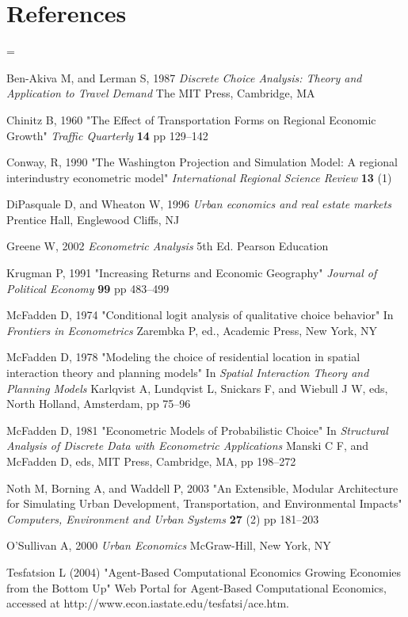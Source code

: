 \section*{References}

\newlength{\lengthstorage}
\lengthstorage=\parindent
\parindent=0pt
\parskip=2mm

Ben-Akiva M, and Lerman S, 1987 \textit{Discrete Choice Analysis:
Theory and Application to Travel Demand}  The MIT Press,
Cambridge, MA

Chinitz B, 1960 "The Effect of Transportation Forms on Regional
Economic Growth" \textit{Traffic Quarterly} \textbf{14} pp
129--142

Conway, R, 1990 "The Washington Projection and Simulation Model: A
regional interindustry econometric model" \textit{International
Regional Science Review} \textbf{13} (1)

DiPasquale D, and Wheaton W, 1996 \textit{Urban economics and real
estate markets} Prentice Hall, Englewood Cliffs, NJ

Greene W, 2002 \textit{Econometric Analysis} 5th Ed. Pearson
Education

Krugman P, 1991 "Increasing Returns and Economic Geography"
\textit{Journal of Political Economy} \textbf{99} pp 483--499


McFadden D, 1974 "Conditional logit analysis of qualitative choice
behavior" In \textit{Frontiers in Econometrics} Zarembka P, ed.,
Academic Press, New York, NY

McFadden D, 1978 "Modeling the choice of residential location in
spatial interaction theory and planning models" In \textit{Spatial
Interaction Theory and Planning Models} Karlqvist A, Lundqvist L,
Snickars F, and Wiebull J W, eds, North Holland, Amsterdam, pp
75--96

McFadden D, 1981 "Econometric Models of Probabilistic Choice" In
\textit{Structural Analysis of Discrete Data with Econometric
Applications} Manski C F, and McFadden D, eds, MIT Press,
Cambridge, MA, pp 198--272


Noth M, Borning A, and Waddell P, 2003 "An Extensible, Modular
Architecture for Simulating Urban Development, Transportation, and
Environmental Impacts" \textit{Computers, Environment and Urban
Systems} \textbf{27} (2) pp 181--203

O'Sullivan A, 2000 \textit{Urban Economics} McGraw-Hill, New York,
NY

Tesfatsion L (2004)  "Agent-Based Computational Economics Growing
Economies from the Bottom Up" Web Portal for Agent-Based
Computational Economics, accessed at
http://www.econ.iastate.edu/tesfatsi/ace.htm.

